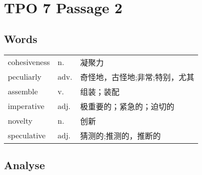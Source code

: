 \section{TPO 7 Passage 2}

\subsection{Words}

\begin{tabular}{lll}
    cohesiveness & n.   & 凝聚力              \\
    peculiarly   & adv. & 奇怪地，古怪地;非常;特别，尤其 \\
    assemble     & v.   & 组装；装配            \\
    imperative   & adj. & 极重要的；紧急的；迫切的     \\
    novelty      & n.   & 创新               \\
    speculative  & adj. & 猜测的;推测的，推断的      \\
\end{tabular}

\subsection{Analyse}

